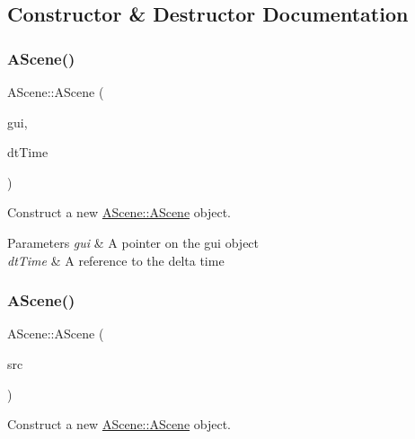 \subsection{Constructor \& Destructor Documentation}
\mbox{\label{class_a_scene_a00e7cd759bb0f43141df51c4ab6e6c47}} 
\subsubsection{\texorpdfstring{A\+Scene()}{AScene()}\hspace{0.1cm}{\footnotesize\ttfamily [1/2]}}
{\footnotesize\ttfamily A\+Scene\+::\+A\+Scene (\begin{DoxyParamCaption}\item[{\hyperlink{class_gui}{Gui} $\ast$}]{gui,  }\item[{float const \&}]{dt\+Time }\end{DoxyParamCaption})}



Construct a new \hyperlink{class_a_scene_a00e7cd759bb0f43141df51c4ab6e6c47}{A\+Scene\+::\+A\+Scene} object. 


\begin{DoxyParams}{Parameters}
{\em gui} & A pointer on the gui object \\
\hline
{\em dt\+Time} & A reference to the delta time \\
\hline
\end{DoxyParams}
\mbox{\label{class_a_scene_aa204afecf39bdfcbe83dad3ed8cce34f}} 
\subsubsection{\texorpdfstring{A\+Scene()}{AScene()}\hspace{0.1cm}{\footnotesize\ttfamily [2/2]}}
{\footnotesize\ttfamily A\+Scene\+::\+A\+Scene (\begin{DoxyParamCaption}\item[{\hyperlink{class_a_scene}{A\+Scene} const \&}]{src }\end{DoxyParamCaption})}



Construct a new \hyperlink{class_a_scene_a00e7cd759bb0f43141df51c4ab6e6c47}{A\+Scene\+::\+A\+Scene} object. 


